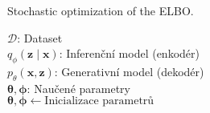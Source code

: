 \begin{algorithm}[H]
    \caption{Stochastic optimization of the ELBO.}\label{alg:reparam_trick}
        \KwData{}
                \hspace{6mm}$\mathcal{D}$: Dataset\\
                \hspace{6mm}$q_\phi(\textbf{z}\mid\textbf{x})$: Inferenční model (enkodér)\\
                \hspace{6mm}$p_\theta(\textbf{x}, \textbf{z})$: Generativní model (dekodér)\\
        \KwResult{}
        \hspace{6mm}$\boldsymbol{\theta}, \boldsymbol{\phi}$: Naučené parametry\\

        $\boldsymbol{\theta}, \boldsymbol{\phi} \gets \text{Inicializace parametrů}$

\end{algorithm}